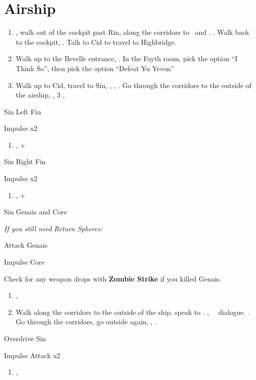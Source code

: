 \chapter{Airship}
\begin{enumerate}
	\item \sd, walk out of the cockpit past Rin, along the corridors to \yuna\ and \kimahri. \sd. Walk back to the cockpit, \sd. Talk to Cid to travel to Highbridge.
	\item Walk up to the Bevelle entrance, \sd. In the Fayth room, pick the  option ``I Think So'', then pick the  option ``Defeat Yu Yevon''
	\item Walk up to Cid, travel to Sin, \sd, \skippablefmv, \sd. Go through the corridors to the outside of the airship, \sd, 3 \skippablefmv[2:10], \sd
\end{enumerate}
\begin{battle}[65000]{Sin Left Fin}
	\begin{itemize}
		\summon{\bahamut}
		\bahamutf Impulse x2
	\end{itemize}
\end{battle}
\begin{enumerate}[resume]
	\item \sd, \cs+\skippablefmv
\end{enumerate}
\begin{battle}[65000]{Sin Right Fin}
	\begin{itemize}
		\summon{\bahamut}
		\bahamutf Impulse x2
	\end{itemize}
\end{battle}
\begin{enumerate}[resume]
	\item \sd, \cs+\skippablefmv
\end{enumerate}
\begin{battle}[56000]{Sin Genais and Core}
	\begin{itemize}
		\summon{\bahamut}
		\textit{If you still need Return Spheres:}
		\begin{itemize}
			\bahamutf Attack Genais
		\end{itemize}
		\bahamutf Impulse Core
	\end{itemize}
	Check for any weapon drops with \textbf{Zombie Strike} if you killed Genais.
\end{battle}
\begin{enumerate}[resume]
	\item \sd, \skippablefmv
	\item Walk along the corridors to the outside of the ship, speak to \yuna. \cs[1:40], \sd\ \rikku\ dialogue. \skippablefmv. Go through the corridors, go outside again, \skippablefmv, \sd.
\end{enumerate}
\begin{battle}[140000]{Overdrive Sin}
	\begin{itemize}
		\summon{\bahamut}
		\bahamutf Impulse
		\bahamutf Attack x2
	\end{itemize}
\end{battle}
\begin{enumerate}[resume]
	\item \skippablefmv[1:20], \sd
\end{enumerate}